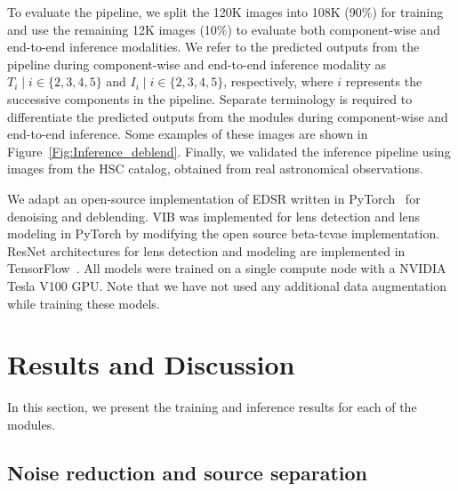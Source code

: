 \documentclass[12pt, twocolumn, apj]{openjournal}
\begin{document}
To evaluate the pipeline, we split the 120K images into 108K (90$\%$) for training and use the remaining 12K images (10$\%$)  to evaluate both component-wise and end-to-end inference modalities. We refer to the predicted outputs from the pipeline during component-wise and end-to-end inference modality as $T_i \mid i \in \{2,3,4,5\}$ and $I_i \mid i \in \{2,3,4,5\}$, respectively, where $i$ represents the successive components in the pipeline. Separate terminology is required to differentiate the predicted outputs from the modules during component-wise and end-to-end inference. Some examples of these images are shown in Figure~\ref{Fig:Inference_deblend}. Finally, we validated the inference pipeline using images from the HSC catalog, obtained from real astronomical observations.

We adapt an open-source implementation of EDSR \citep{lim2017enhanced} written in PyTorch~\citep{paszke2017automatic} for denoising and deblending. VIB was implemented for lens detection and lens modeling in PyTorch by modifying the open source beta-tcvae implementation. ResNet architectures for lens detection and modeling are implemented in TensorFlow~\citep{abadi2016tensorflow}. All models were trained on a single compute node with a NVIDIA Tesla V100 GPU. Note that we have not used any additional data augmentation while training these models.


\section{Results and Discussion}

In this section, we present the training and inference results for each of the modules.

\subsection{Noise reduction and source separation}
\end{document}
